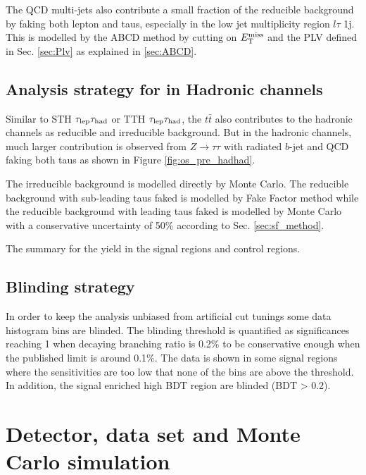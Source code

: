 The QCD multi-jets also contribute a small fraction of the reducible background by faking both lepton and taus, especially in the low jet multiplicity region $l\tau$ 1j. This is modelled by the ABCD method by cutting on $E_{\text{T}}^{\text{miss}}$ and the PLV defined in Sec. \ref{sec:Plv} as explained in \ref{sec:ABCD}.

\subsection{Analysis strategy for in Hadronic channels}

Similar to STH $\tau_\text{lep}{}\tau_\text{had}$ or TTH $\tau_\text{lep}{}\tau_\text{had}$, the $t\bar{t}$ also contributes to the hadronic channels as reducible and irreducible background. But in the hadronic channels, much larger contribution is observed from $Z\to \tau\tau$ with radiated $b$-jet and QCD faking both taus as shown in Figure \ref{fig:os_pre_hadhad}. 

The irreducible background is modelled directly by Monte Carlo. The reducible background with sub-leading taus faked is modelled by Fake Factor method while the reducible background with leading taus faked is modelled by Monte Carlo with a conservative uncertainty of 50\% according to Sec. \ref{sec:sf_method}.

\begin{table}
\caption{The summary for the yield in the signal regions and control regions.}
\label{tab:yield_raw}
\small


\end{table}

\subsection{Blinding strategy}
\label{sec:blind}

In order to keep the analysis unbiased from artificial cut tunings some data histogram bins are blinded. The blinding threshold is quantified as significances reaching 1 when decaying branching ratio is 0.2\% to be conservative enough when the published limit is around 0.1\%. The data is shown in some signal regions where the sensitivities are too low that none of the bins are above the threshold. In addition, the signal enriched high BDT region are blinded (BDT > 0.2).

\section{Detector, data set and Monte Carlo simulation}

